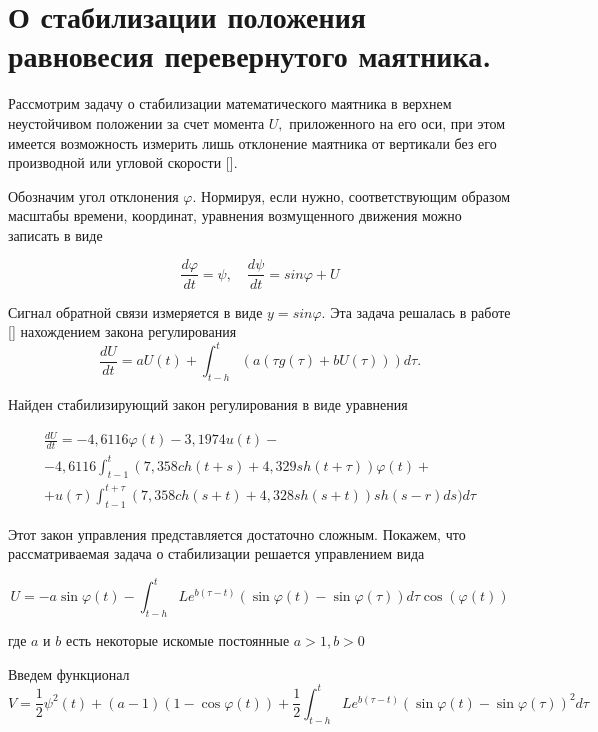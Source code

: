 \section{О стабилизации положения равновесия перевернутого маятника.} \label{p14}

Рассмотрим задачу о стабилизации математического маятника в верхнем неустойчивом положении за счет момента $U,$ приложенного на его оси, при этом имеется возможность измерить лишь отклонение маятника от вертикали без его производной или угловой скорости [].

Обозначим угол отклонения $\varphi.$ Нормируя, если нужно, соответствующим образом масштабы времени, координат, уравнения возмущенного движения можно записать в виде

\begin{equation} \label{1.45'}
\frac{d \varphi}{dt} = \psi, \quad \frac{d \psi}{dt} = sin \varphi + U
\end{equation}

Сигнал обратной связи измеряется в виде $y = sin \varphi$. Эта задача решалась в работе [] нахождением закона регулирования $$\frac{d U}{d t} = a U(t) + \int_{t - h}^{t} (a (\tau g (\tau) + b U (\tau))) d \tau.$$

Найден стабилизирующий закон регулирования в виде уравнения

\begin{equation} \label{1.46'}
\begin{array}{c}
\displaystyle \frac{d U}{d t} = - 4,6116 \varphi (t) - 3,1974 u(t) -\\
\displaystyle - 4,6116 \int_{t - 1}^{t} (7,358 ch(t + s) + 4,329 sh(t + \tau)) \varphi (t) +\\
\displaystyle + u(\tau) \int_{t - 1}^{t + \tau} (7,358 ch(s + t) + 4,328 sh(s + t)) sh(s - r) ds) d \tau
\end{array}
\end{equation}

Этот закон управления представляется достаточно сложным. Покажем, что рассматриваемая задача о стабилизации решается управлением вида 

\begin{equation} \label{1.47'}
U = - a \sin \varphi (t) - \int_{t-h}^{t} L e^{ b (\tau - t)} (\sin \varphi (t) - \sin \varphi (\tau)) d \tau \cos (\varphi(t))
\end{equation}

где $a$ и $b$ есть некоторые искомые постоянные $a > 1, b > 0$

Введем функционал $$V = \frac12 \psi ^ 2 (t) + (a - 1) (1 - \cos \varphi (t)) + \frac12 \int_{t-h}^{t} L e^{b (\tau - t)} (\sin \varphi(t) - \sin \varphi (\tau))^2 d \tau$$

